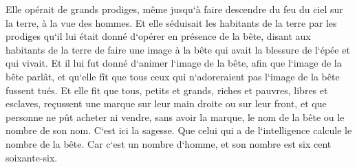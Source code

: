 \verse Elle opérait de grands prodiges, même jusqu`à faire descendre du feu du ciel sur la terre, à la vue des hommes. 
\verse Et elle séduisait les habitants de la terre par les prodiges qu`il lui était donné d`opérer en présence de la bête, disant aux habitants de la terre de faire une image à la bête qui avait la blessure de l`épée et qui vivait. 
\verse Et il lui fut donné d`animer l`image de la bête, afin que l`image de la bête parlât, et qu`elle fît que tous ceux qui n`adoreraient pas l`image de la bête fussent tués. 
\verse Et elle fit que tous, petits et grands, riches et pauvres, libres et esclaves, reçussent une marque sur leur main droite ou sur leur front, 
\verse et que personne ne pût acheter ni vendre, sans avoir la marque, le nom de la bête ou le nombre de son nom. 
\verse C`est ici la sagesse. Que celui qui a de l`intelligence calcule le nombre de la bête. Car c`est un nombre d`homme, et son nombre est six cent soixante-six. 

